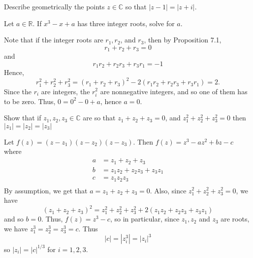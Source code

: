 \documentclass[11pt,dvipsnames]{book}
\def\C{{\mathbb{C}}}
\numberwithin{equation}{section} %
\numberwithin{figure}{section} %
\numberwithin{table}{section} %
\begin{document}
\begin{exercise} Describe geometrically the points $z\in\mathbb{C}$ so that $|z-1|=|z+i|$. 



\end{exercise}





\begin{exercise} 
 Let $a\in \mathbb{R}$. If $x^{3}-x+a$ has three integer roots, solve for $a$. 

\begin{solution}


Note that if the integer roots are $r_{1},r_{2}$, and $r_{3}$, then by Proposition 7.1,
\[
r_{1}+r_{2}+r_{3}=0\]
and 
\[
r_{1}r_{2}+r_{2}r_{3}+r_{3}r_{1}=-1
\]
Hence,
\[
r_{1}^{2}+r_{2}^{2}+r_{3}^{2} = (r_{1}+r_{2}+r_{3})^{2}-2(r_{1}r_{2}+r_{2}r_{3}+r_{3}r_{1})=2.
\]
Since the $r_{i}$ are integers, the $r_{i}^{2}$ are nonnegative integers, and so one of them has to be zero. Thus, $0=0^{2}-0+a$, hence $a=0$. 

\end{solution}


\end{exercise}





\begin{exercise} Show that if $z_1,z_2,z_3\in \C$ are so that $z_1+z_2+z_3=0$, and $z_1^2+z_2^2+z_3^2=0$ then $|z_1|=|z_2|=|z_3|$


\begin{solution}
Let $f(z)=(z-z_1)(z-z_2)(z-z_3)$. Then $f(z)=z^3-az^2+bz-c$ where 
\begin{align*}
a&=z_1+z_2+z_3\\[4pt]
b&=z_1z_2+z_2z_3+z_3z_1\\[4pt]
c&=z_1z_2z_3\\[4pt]
\end{align*}
By assumption, we get that $a=z_1+z_2+z_3=0$.  Also, since $z_{1}^2+z_{2}^2+z_{3}^2=0$, we have 
\[
(z_1+z_2+z_3)^2=z_1^2+z_2^2+z_3^2+2(z_1z_2+z_2z_3+z_3z_1)
\]
and so $b=0$. Thus, $f(z)=z^3-c$, so in particular, since $z_{1},z_{2}$ and $z_{3}$ are roots, we have $z_{1}^3=z_{2}^3=z_{3}^{3}=c$. Thus
\[
|c|=|z_{i}^3|=|z_{i}|^3
\]
so $|z_{i}|=|c|^{1/3}$ for $i=1,2,3$. 
\end{solution}

\end{exercise}
\end{document}
